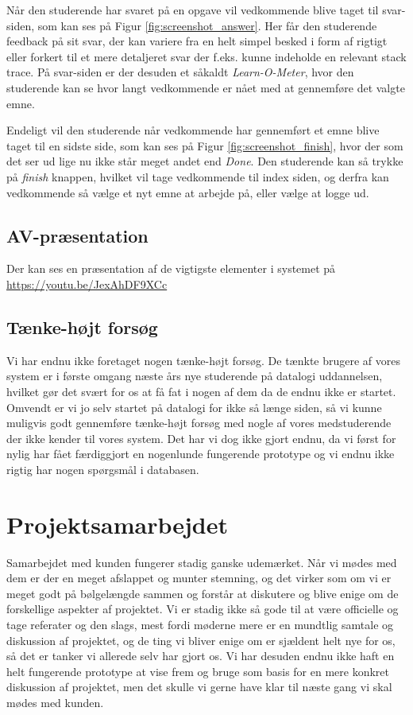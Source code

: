 \documentclass[11pt, a4paper]{article}
\begin{document}
Når den studerende har svaret på en opgave vil vedkommende blive taget til svar-siden, som kan ses på Figur \ref{fig:screenshot_answer}. Her får den studerende feedback på sit svar, der kan variere fra en helt simpel besked i form af rigtigt eller forkert til et mere detaljeret svar der f.eks. kunne indeholde en relevant stack trace. På svar-siden er der desuden et såkaldt \emph{Learn-O-Meter}, hvor den studerende kan se hvor langt vedkommende er nået med at gennemføre det valgte emne.

Endeligt vil den studerende når vedkommende har gennemført et emne blive taget til en sidste side, som kan ses på Figur \ref{fig:screenshot_finish}, hvor der som det ser ud lige nu ikke står meget andet end \emph{Done}. Den studerende kan så trykke på \emph{finish} knappen, hvilket vil tage vedkommende til index siden, og derfra kan vedkommende så vælge et nyt emne at arbejde på, eller vælge at logge ud.

\subsection{AV-præsentation}
\label{sub:av_praesentation}

Der kan ses en præsentation af de vigtigste elementer i systemet på \url{https://youtu.be/JexAhDF9XCc}

\subsection{Tænke-højt forsøg}
Vi har endnu ikke foretaget nogen tænke-højt forsøg. De tænkte brugere af vores system er i første omgang næste års nye studerende på datalogi uddannelsen, hvilket gør det svært for os at få fat i nogen af dem da de endnu ikke er startet. Omvendt er vi jo selv startet på datalogi for ikke så længe siden, så vi kunne muligvis godt gennemføre tænke-højt forsøg med nogle af vores medstuderende der ikke kender til vores system. Det har vi dog ikke gjort endnu, da vi først for nylig har fået færdiggjort en nogenlunde fungerende prototype og vi endnu ikke rigtig har nogen spørgsmål i databasen.

\section{Projektsamarbejdet}
\label{sec:projektsamarbejdet}
Samarbejdet med kunden fungerer stadig ganske udemærket. Når vi mødes med dem er der en meget afslappet og munter stemning, og det virker som om vi er meget godt på bølgelængde sammen og forstår at diskutere og blive enige om de forskellige aspekter af projektet. Vi er stadig ikke så gode til at være officielle og tage referater og den slags, mest fordi møderne mere er en mundtlig samtale og diskussion af projektet, og de ting vi bliver enige om er sjældent helt nye for os, så det er tanker vi allerede selv har gjort os. Vi har desuden endnu ikke haft en helt fungerende prototype at vise frem og bruge som basis for en mere konkret diskussion af projektet, men det skulle vi gerne have klar til næste gang vi skal mødes med kunden.
\end{document}
